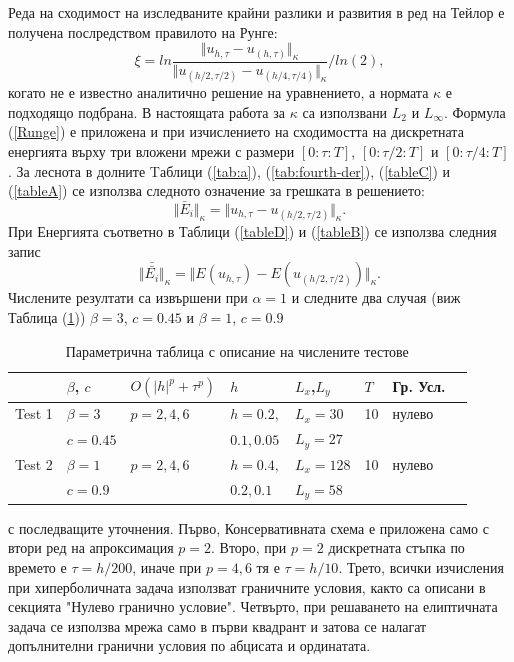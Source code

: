 \documentclass{article}
\newcommand{\rf}[1]{(\ref{#1})}
\begin{document}
Реда на сходимост на изследваните крайни разлики и развития в ред на Тейлор е получена послредством правилото на Рунге:
\begin{equation}\label{Runge}
\xi = ln  \frac{\Vert u_{h,\tau} - u_{(h,\tau)} \Vert_\kappa } {\Vert  u_{(h/2,\tau/2)} - u_{(h/4,\tau/4)} \Vert_\kappa  } / ln(2),
\end{equation}
когато не е известно аналитично решение на уравнението, а нормата $\kappa$ е подходящо подбрана. В настоящата работа за $\kappa$ са използвани $L_2$ и $L_\infty$. Формула \rf{Runge} е приложена и при изчислението на сходимостта на дискретната енергията върху три вложени мрежи с размери $[0:\tau:T]$, $[0:\tau/2:T]$ и $[0:\tau/4:T]$. За леснота в долните Tаблици \rf{tab:a}, \rf{tab:fourth-der}, \rf{tableC} и \rf{tableA} се използва следното означение за грешката в решението:
$$\Vert \bar E_i \Vert_\kappa =  \Vert u_{h,\tau} - u_{(h/2,\tau/2)} \Vert_\kappa.$$ 
При Енергията съответно в Таблици \rf{tableD} и \rf{tableB} се използва следния запис
$$\Vert \bar{\bar{ E_i}} \Vert_\kappa=  \Vert E(u_{h,\tau}) - E(u_{(h/2,\tau/2)}) \Vert_\kappa.$$ 
Числените резултати са извършени при $\alpha = 1$ и следните два случая (виж Таблица \rf{tableP}) $\beta = 3$, $c=0.45$ и $\beta = 1$, $c=0.9$ \begin{table}
\centering
\small
		\begin{tabular}{||c|l|l|l|l|l|l|l||}
			\hline
			\hline
          &    $\beta$, $c$ 	 & $O(|h|^p+\tau^p)$   &      $h$       	& $L_x$,$L_y$   	&  $T$    	& Гр. Усл.  \\
   			\hline 
			\hline
Test 1  &      $\beta = 3$   &      $p=2, 4, 6$    	&    $h=0.2,$       	& $L_x = 30$     	&    10    	&    нулево  \\
          &      $c=0.45$       &                           	&    $ 0.1, 0.05$   	& $L_y=27	$    	&        		&       		\\
	   \hline
			\hline 
Test 2	&      $\beta = 1$	&      $p=2, 4, 6$    	&     $h=0.4,$      	& $L_x = 128$    	&   10    	&   нулево  \\
           &      $c=0.9$      	&                       		&      $0.2, 0.1$     & $L_y=58$         &          	&     \\
	   \hline
			\hline 
		\end{tabular}
\caption{Параметрична таблица с описание на числените тестове}
\label{tableP}
\end{table}
с последващите уточнения. Първо, Консервативната схема е приложена само с втори ред на апроксимация  $p=2$. Второ, при $p=2$ дискретната стъпка по времето е 
 $\tau=h/200$, иначе при $p=4, 6$ тя е $\tau = h/10$. Трето, всички изчисления при хиперболичната задача използват граничните условия, както са описани в секцията "Нулево гранично условие". Четвърто, при решаването на елиптичната задача се използва мрежа само в първи квадрант и затова се налагат допълнителни гранични условия по абцисата и ординатата.
\end{document}
